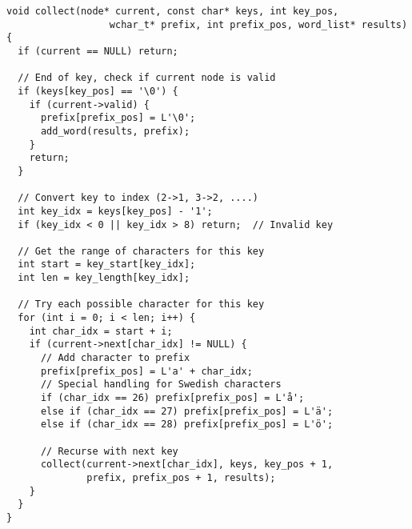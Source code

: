 \documentclass[a4paper,11pt]{article}
\begin{document}
\begin{verbatim}
void collect(node* current, const char* keys, int key_pos, 
                  wchar_t* prefix, int prefix_pos, word_list* results) {
  if (current == NULL) return;
  
  // End of key, check if current node is valid
  if (keys[key_pos] == '\0') {
    if (current->valid) {
      prefix[prefix_pos] = L'\0';
      add_word(results, prefix);
    }
    return;
  }
  
  // Convert key to index (2->1, 3->2, ....)
  int key_idx = keys[key_pos] - '1';
  if (key_idx < 0 || key_idx > 8) return;  // Invalid key
  
  // Get the range of characters for this key
  int start = key_start[key_idx];
  int len = key_length[key_idx];
  
  // Try each possible character for this key
  for (int i = 0; i < len; i++) {
    int char_idx = start + i;
    if (current->next[char_idx] != NULL) {
      // Add character to prefix
      prefix[prefix_pos] = L'a' + char_idx;
      // Special handling for Swedish characters
      if (char_idx == 26) prefix[prefix_pos] = L'å';
      else if (char_idx == 27) prefix[prefix_pos] = L'ä';
      else if (char_idx == 28) prefix[prefix_pos] = L'ö';
      
      // Recurse with next key
      collect(current->next[char_idx], keys, key_pos + 1, 
              prefix, prefix_pos + 1, results);
    }
  }
}
\end{verbatim}
\end{document}
